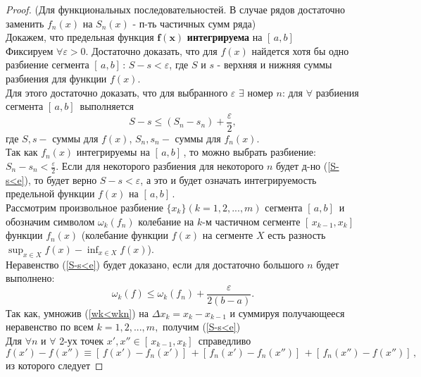 \begin{proof} (Для функциональных последовательностей. В случае рядов достаточно заменить $f_n(x)$ на $S_n(x)$ - п-ть частичных сумм ряда) \\
Докажем, что предельная функция $\boldsymbol{f(x)}$ \textbf{интегрируема} на $[\,a,b]\,$ \\

Фиксируем $\forall \varepsilon > 0$. Достаточно доказать, что для $f(x)$ найдется хотя бы одно разбиение сегмента $[\,a,b]\,$: $S-s<\varepsilon$, где $S$ и $s$ - верхняя и нижняя суммы разбиения для функции $f(x)$. \\ 

Для этого достаточно доказать, что для выбранного $\varepsilon$ $\exists$ номер $n$: для $\forall$ разбиения сегмента $[\,a,b]\,$ выполняется
\begin{equation}\label{S-s<e}
    S-s \le (S_n - s_n) + \frac{\varepsilon}{2},
\end{equation}
где $S,s-$ суммы для $f(x)$, $S_n,s_n -$ суммы для $f_n(x)$. \\

Так как $f_n(x)$ интегрируемы на $[\,a,b]\,$, то можно выбрать разбиение: $S_n-s_n < \frac{\varepsilon}{2}$. Если для некоторого разбиения для некоторого $n$ будет д-но (\ref{S-s<e}), то будет верно $S -s < \varepsilon$, а это и будет означать интегрируемость предельной функции $f(x)$ на $[\,a,b]\,$. \\

Рассмотрим произвольное разбиение $\{x_k\} (k=1,2, ..., m)$ сегмента $[\,a,b]\,$ и обозначим символом $\omega_k(f_n) $ колебание на $k$-м частичном сегменте $[\,x_{k-1}, x_k]\,$ функции $f_n(x)$ (колебание функции $f(x)$ на сегменте $X$ есть разность $\sup_{x \in X}{f(x)} - \inf_{x \in X}{f(x)}$). \\

Неравенство (\ref{S-s<e}) будет доказано, если для достаточно большого $n$ будет выполнено:
\begin{equation}\label{wk<wkn}
    \omega_k(f) \le \omega_k(f_n) + \frac{\varepsilon}{2(b-a)}.
\end{equation}
Так как, умножив (\ref{wk<wkn}) на $\Delta x_k = x_k - x_{k-1}$ и суммируя получающееся неравенство по всем $k=1,2, ..., m,$ получим (\ref{S-s<e}) \\
Для $\forall n$ и $\forall$ 2-ух точек $x', x'' \in [\,x_{k-1}, x_k]\,$ справедливо $f(x') - f(x'') \equiv [\, f(x') - f_n(x')]\, +  [\, f_n(x') - f_n(x'')]\, +  [\, f_n(x'') - f(x'')]\,,$ из которого следует 


\end{proof}
